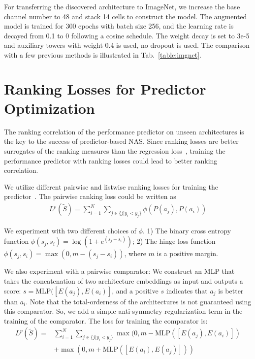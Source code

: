 \documentclass[runningheads]{llncs}
\begin{document}
For transferring the discovered architecture to ImageNet, we increase the base channel number to 48 and stack 14 cells to construct the model. The augmented model is trained for 300 epochs with batch size 256, and the learning rate is decayed from 0.1 to 0 following a cosine schedule. The weight decay is set to 3e-5 and auxiliary towers with weight 0.4 is used, no dropout is used. The comparison with a few previous methods is illustrated in Tab.~\ref{table:imgnet}.



\section{Ranking Losses for Predictor Optimization}

The ranking correlation of the performance predictor on unseen architectures is the key to the success of predictor-based NAS. 
Since ranking losses are better surrogates of the ranking measures than the regression loss~\cite{chen2009}, training the performance predictor with ranking losses could lead to better ranking correlation.

We utilize different pairwise and listwise ranking losses for training the predictor~\cite{burges2005learning,shashua2003ranking,xia2008listwise}. The pairwise ranking loss could be written as
\begin{equation}
    \begin{aligned}
    L^p(\tilde{S})= \sum_{i=1}^{N} \sum_{j \in \{j | y_i < y_j\}} \phi(P(a_j), P(a_i))
    \end{aligned}
\end{equation}


We experiment with two different choices of $\phi$. 1) The binary cross entropy function $\phi(s_j, s_i)=\log(1 + e^{(s_j - s_i)})$; 
2) The hinge loss function $\phi(s_j, s_i)= \max(0, m - (s_j - s_i))$, where $m$ is a positive margin.

We also experiment with a pairwise comparator: We construct an MLP that takes the concatenation of two architecture embeddings as input and outputs a score: $s=\mbox{MLP}([E(a_j), E(a_i)]$, and a positive $s$ indicates that $a_j$ is better than $a_i$.  Note that the total-orderness of the architectures is not guaranteed using this comparator. So, we add a simple anti-symmetry regularization term in the training of the comparator. The loss for training the comparator is:
\begin{equation}
    \begin{aligned}
    L^p(\tilde{S})= &\sum_{i=1}^{N} \sum_{j \in \{j | y_i < y_j\}} \max(0, m - \mbox{MLP}([E(a_j), E(a_i)]) \\
    &+ \max(0, m + \mbox{MLP}([E(a_i), E(a_j)]))
    \end{aligned}
\end{equation}
\end{document}
